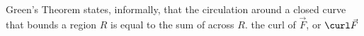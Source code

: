 {Green's Theorem states, informally, that the circulation around a closed curve that bounds a region $R$ is equal to the sum of \underline{\hskip1in} across $R$.
}
{the curl of $\vec F$, or $\curl \vec F$
}
